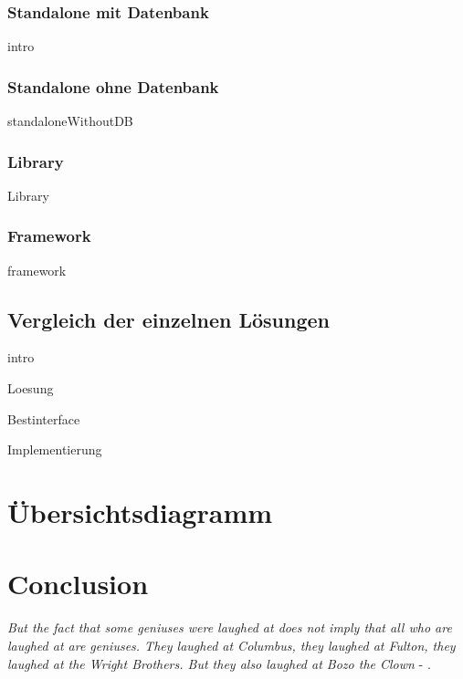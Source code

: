 \documentclass{article}
\begin{document}
        \newpage
        \subsubsection{Standalone mit Datenbank}
            {intro}

        \newpage
        \subsubsection{Standalone ohne Datenbank}
            {standaloneWithoutDB}

        \newpage
        \subsubsection{Library}
            {Library}
        
        \newpage
        \subsubsection{Framework}
            {framework}
    
    \subsection{Vergleich der einzelnen Lösungen}
        {intro}


{Loesung}


\newpage
{Bestinterface}

\newpage
{Implementierung}

\section{Übersichtsdiagramm}

\section{Conclusion}
\textit{But the fact that some geniuses were laughed at does not imply that all who are laughed at are geniuses. They laughed at Columbus, they laughed at Fulton, they laughed at the Wright Brothers. But they also laughed at Bozo the Clown} -  \textcite{sagan_1993}.

\newpage
\printbibliography[heading = bibintoc, title = Bibliography]    %

\end{document}
